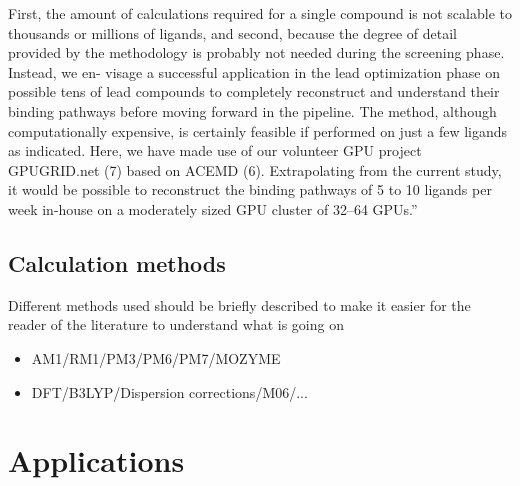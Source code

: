 \begin{itemize}
{First, the amount of calculations required for a single compound is not scalable to thousands or millions of ligands, and second, because the degree of detail provided by the methodology is probably not needed during the screening phase.
Instead, we en- visage a successful application in the lead optimization phase on possible tens of lead compounds to completely reconstruct and understand their binding pathways before moving forward in the pipeline.
The method, although computationally expensive, is certainly feasible if performed on just a few ligands as indicated.
Here, we have made use of our volunteer GPU project GPUGRID.net (7) based on ACEMD (6).
Extrapolating from the current study, it would be possible to reconstruct the binding pathways of 5 to 10 ligands per week in-house on a moderately sized GPU cluster of 32–64 GPUs.}''\cite{buch2011complete}
\end{itemize}

\subsection{Calculation methods}
Different methods used should be briefly described to make it easier for the reader of the literature to understand what is going on
\begin{itemize}
\item AM1/RM1/PM3/PM6/PM7/MOZYME
\item DFT/B3LYP/Dispersion corrections/M06/...
\end{itemize}


\section{Applications}\label{sec:apps}

